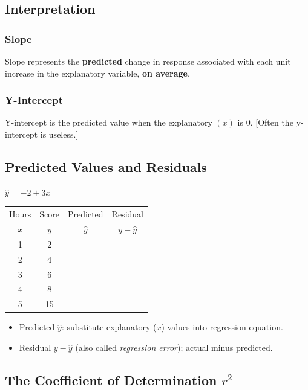 \documentclass[9pt, oneside]{extarticle}   	%
\begin{document}
\subsection{Interpretation} %
\label{sub:interpretation}
\subsubsection{Slope}
Slope represents the  \textbf{predicted} change in response associated with each unit increase in the explanatory variable, \textbf{on average}.\\[.25in]
\subsubsection{Y-Intercept}
Y-intercept is the predicted value when the explanatory $(x)$ is 0. [Often the y-intercept is useless.]


\subsection{Predicted Values and Residuals}
	$\hat{y}=-2+3x$
	\begin{table}[ht]
	\large
	\begin{tabular*}{6cm}[h]{cccc}
	Hours & Score & Predicted & Residual\\
	$x$ & $y$ & $\hat{y}$ & $y-\hat{y}$\\
	1 & 2 & \quad & \\
	2 & 4 & \quad & \\
	3 & 6 & \quad & \\
	4 & 8 & \quad & \\
	5 & 15 & \quad &
	\end{tabular*}
	\end{table}


	\begin{itemize}
		\item Predicted $\hat{y}$: substitute explanatory ($x$) values into regression equation.
		\item Residual $y-\hat{y}$ (also called {\em regression error}); actual minus predicted.
	\end{itemize}



	\subsection{The Coefficient of Determination $r^2$} %
	\label{sub:subsection_name}
\end{document}

